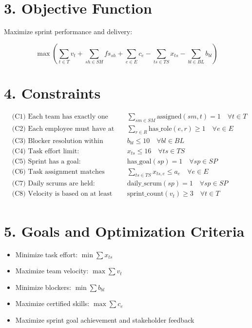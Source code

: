 \documentclass{article}
\begin{document}
\section*{3. Objective Function}

Maximize sprint performance and delivery:

\[
\max \left(
\sum_{t \in T} v_t + \sum_{sh \in SH} fs_{sh} + \sum_{e \in E} c_e - \sum_{ts \in TS} x_{ts} - \sum_{bl \in BL} b_{bl}
\right)
\]

\section*{4. Constraints}

\begin{align*}
&\text{(C1) Each team has exactly one Scrum Master:} && \sum_{sm \in SM} \text{assigned}(sm, t) = 1 \quad \forall t \in T \\
&\text{(C2) Each employee must have at least one role:} && \sum_{r \in R} \text{has\_role}(e, r) \geq 1 \quad \forall e \in E \\
&\text{(C3) Blocker resolution within max time:} && b_{bl} \leq 10 \quad \forall bl \in BL \\
&\text{(C4) Task effort limit:} && x_{ts} \leq 16 \quad \forall ts \in TS \\
&\text{(C5) Sprint has a goal:} && \text{has\_goal}(sp) = 1 \quad \forall sp \in SP \\
&\text{(C6) Task assignment matches employee availability:} && \sum_{ts \in TS} x_{ts,e} \leq a_{e} \quad \forall e \in E \\
&\text{(C7) Daily scrums are held:} && \text{daily\_scrum}(sp) = 1 \quad \forall sp \in SP \\
&\text{(C8) Velocity is based on at least 3 sprints:} && \text{sprint\_count}(v_t) \geq 3 \quad \forall t \in T \\
\end{align*}

\section*{5. Goals and Optimization Criteria}

\begin{itemize}
  \item Minimize task effort: $\min \sum x_{ts}$
  \item Maximize team velocity: $\max \sum v_{t}$
  \item Minimize blockers: $\min \sum b_{bl}$
  \item Maximize certified skills: $\max \sum c_e$
  \item Maximize sprint goal achievement and stakeholder feedback
\end{itemize}
\end{document}
